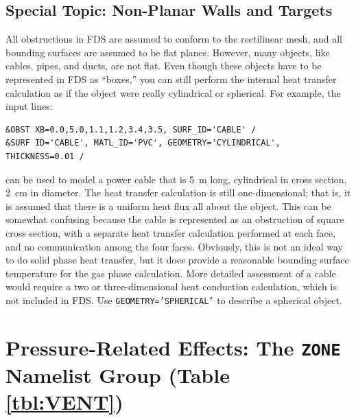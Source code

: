\documentclass[11pt]{book}
\newcommand{\ct}{\tt\small}
\begin{document}
\subsection{Special Topic: Non-Planar Walls and Targets}
All obstructions in FDS are assumed to conform to the rectilinear
mesh, and all bounding surfaces are assumed to be flat
planes. However, many objects, like cables, pipes, and ducts, are not
flat. Even though these objects have to be represented in FDS as
``boxes,'' you can still perform the internal heat transfer
calculation as if the object were really cylindrical or spherical. For
example, the input lines:

\footnotesize
\begin{verbatim}
&OBST XB=0.0,5.0,1.1,1.2,3.4,3.5, SURF_ID='CABLE' /
&SURF ID='CABLE', MATL_ID='PVC', GEOMETRY='CYLINDRICAL', THICKNESS=0.01 /
\end{verbatim} \normalsize

\noindent
can be used to model a power cable that is 5~m long, cylindrical in
cross section, 2~cm in diameter. The heat transfer calculation is
still one-dimensional; that is, it is assumed that there is a uniform
heat flux all about the object. This can be somewhat confusing because
the cable is represented as an obstruction of square cross section,
with a separate heat transfer calculation performed at each face, and
no communication among the four faces. Obviously, this is not an ideal
way to do solid phase heat transfer, but it does provide a reasonable
bounding surface temperature for the gas phase calculation. More
detailed assessment of a cable would require a two or
three-dimensional heat conduction calculation, which is not included
in FDS. Use {\ct GEOMETRY='SPHERICAL'} to describe a spherical object.







\clearpage

\section{Pressure-Related Effects: The \texorpdfstring{{\tt ZONE}}{ZONE} Namelist Group (Table \ref{tbl:VENT})}
\label{info:ZONE}  
\end{document}
